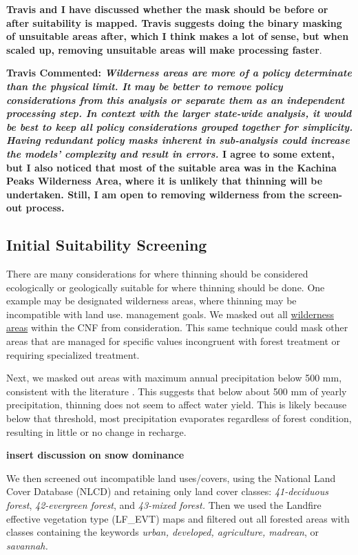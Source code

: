 \documentclass[
  number,
  preprint,
  3p,
  onecolumn]{elsarticle}
\begin{document}
\textbf{Travis and I have discussed whether the mask should be before or
after suitability is mapped. Travis suggests doing the binary masking of
unsuitable areas after, which I think makes a lot of sense, but when
scaled up, removing unsuitable areas will make processing faster}.

\textbf{Travis Commented: \emph{Wilderness areas are more of a policy
determinate than the physical limit. It may be better to remove policy
considerations from this analysis or separate them as an independent
processing step. In context with the larger state-wide analysis, it
would be best to keep all policy considerations grouped together for
simplicity. Having redundant policy masks inherent in sub-analysis could
increase the models' complexity and result in errors.} I agree to some
extent, but I also noticed that most of the suitable area was in the
Kachina Peaks Wilderness Area, where it is unlikely that thinning will
be undertaken. Still, I am open to removing wilderness from the
screen-out process.}

\subsection{Initial Suitability
Screening}\label{initial-suitability-screening}

There are many considerations for where thinning should be considered
ecologically or geologically suitable for where thinning should be done.
One example may be designated wilderness areas, where thinning may be
incompatible with land use. management goals. We masked out all
\href{https://gis1.usgs.gov/arcgis/rest/services/padus3/Fee_Managers/MapServer}{wilderness
areas} within the CNF from consideration. This same technique could mask
other areas that are managed for specific values incongruent with forest
treatment or requiring specialized treatment.

Next, we masked out areas with maximum annual precipitation below 500
mm, consistent with the literature
\citep{bosch1982, hibbert1979b, adams2012a, biederman2022a}. This
suggests that below about 500 mm of yearly precipitation, thinning does
not seem to affect water yield. This is likely because below that
threshold, most precipitation evaporates regardless of forest condition,
resulting in little or no change in recharge.

\textbf{insert discussion on snow dominance}

We then screened out incompatible land uses/covers, using the National
Land Cover Database (NLCD) and retaining only land cover classes:
\emph{41-deciduous forest}, \emph{42-evergreen forest}, and
\emph{43-mixed forest.} Then we used the Landfire effective vegetation
type (LF\_EVT) maps and filtered out all forested areas with classes
containing the keywords \emph{urban, developed, agriculture, madrean},
or \emph{savannah.}
\end{document}

